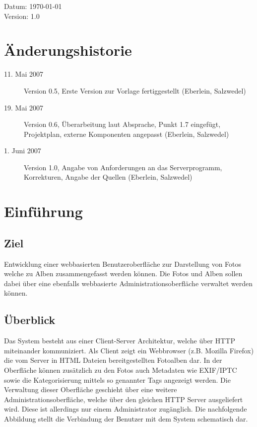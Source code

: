 \documentclass[a4paper,12pt,liststotocnumbered]{scrartcl}
\newcommand{\lxVersion}[0]{1.0}
\begin{document}
\begin{center}
	Datum: \today\\
	Version: \lxVersion
\end{center}

\newpage

\section*{Änderungshistorie}
\begin{description}
	\item[11. Mai 2007] Version 0.5, Erste Version zur Vorlage
		fertiggestellt (Eberlein, Salzwedel)
	\item[19. Mai 2007] Version 0.6, Überarbeitung laut Absprache, Punkt
		1.7 eingefügt, Projektplan, externe Komponenten angepasst
		(Eberlein, Salzwedel)
	\item[1. Juni 2007] Version 1.0, Angabe von Anforderungen an das
		Serverprogramm, Korrekturen, Angabe der Quellen (Eberlein,
		Salzwedel)
\end{description}
\newpage

\tableofcontents

\newpage

\section{Einführung}
\subsection{Ziel}

Entwicklung einer webbasierten Benutzeroberfläche zur Darstellung von Fotos
welche zu Alben zusammengefasst werden können. Die Fotos und Alben sollen
dabei über eine ebenfalls webbasierte Administrationsoberfläche verwaltet
werden können.

\subsection{Überblick}

Das System besteht aus einer Client-Server Architektur, welche über HTTP
miteinander kommuniziert. Als Client zeigt ein Webbrowser (z.B. Mozilla
Firefox) die vom Server in HTML Dateien bereitgestellten Fotoalben dar. In der
Oberfläche können zusätzlich zu den Fotos auch Metadaten wie EXIF/IPTC sowie
die Kategorisierung mittels so genannter Tags angezeigt werden. Die Verwaltung
dieser Oberfläche geschieht über eine weitere Administrationsoberfläche,
welche über den gleichen HTTP Server ausgeliefert wird. Diese ist allerdings
nur einem Administrator zugänglich. Die nachfolgende Abbildung stellt die
Verbindung der Benutzer mit dem System schematisch dar.
\end{document}
